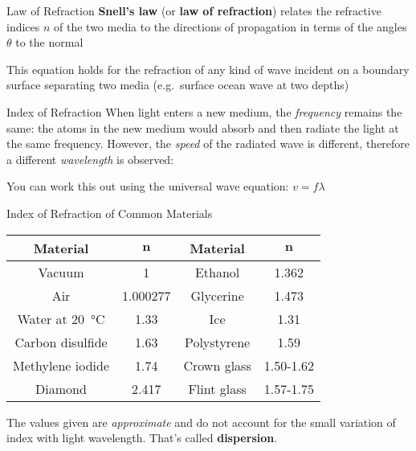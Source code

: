 \documentclass[12pt,compress,aspectratio=169]{beamer}
\newcommand{\pic}[2]{\texttt{[image: \#2]}}
\newcommand{\eq}[2]{\vspace{#1}{\LARGE\begin{displaymath}#2\end{displaymath}}}
\begin{document}
\begin{frame}{Law of Refraction}
  \textbf{Snell's law} (or \textbf{law of refraction}) relates the refractive
  indices $n$ of the two media to the directions of propagation in terms of the
  angles $\theta$ to the normal

  \eq{-.2in}{
    \boxed{n_1\sin\theta_1=n_2\sin\theta_2}
  }

  This equation holds for the refraction of any kind of wave incident on a
  boundary surface separating two media (e.g.\ surface ocean wave at two
  depths)
\end{frame}



%    



\begin{frame}{Index of Refraction}
  When light enters a new medium, the \emph{frequency} remains the same: the
  atoms in the new medium would absorb and then radiate the light at the same
  frequency. However, the \emph{speed} of the radiated wave is different,
  therefore a different \emph{wavelength} is observed:
    
  \eq{-.2in}{
    \boxed{\frac{n_1}{n_2}=\frac{\lambda_2}{\lambda_1}}
  }

  You can work this out using the universal wave equation: $v=f\lambda$
\end{frame}



\begin{frame}{Index of Refraction of Common Materials}
  \begin{center}
    \begin{tabular}{c|c||c|c}
      \rowcolor{pink}
      \textbf{Material} & $\bm{n}$ & \textbf{Material} & $\bm{n}$\\ \hline
      Vacuum           & 1        & Ethanol     & 1.362 \\
      Air              & 1.000277 & Glycerine   & 1.473 \\
      Water at \SI{20}{\celsius} & 1.33 & Ice         & 1.31 \\
      Carbon disulfide & 1.63     & Polystyrene & 1.59 \\
      Methylene iodide & 1.74     & Crown glass & 1.50-1.62\\
      Diamond          & 2.417    & Flint glass & 1.57-1.75\\
    \end{tabular}
  \end{center}
  The values given are \emph{approximate} and do not account for the small
  variation of index with light wavelength. That's called \textbf{dispersion}.
\end{frame}
\end{document}
